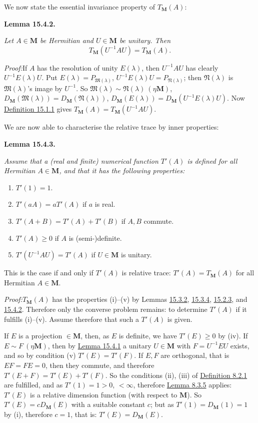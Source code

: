 \documentclass[12pt,b5paper,twoside]{article}
\newcommand{\M}{\mathbf M}
\newcommand{\Lemma}[1]{%
  \par\smallskip\noindent\phantomsection\label{lem:#1}\textbf{Lemma #1.}\enspace
}
\newcommand{\Proof}{\par\noindent\textit{Proof:}\enspace}
\newcommand{\defref}[1]{\hyperref[def:#1]{Definition #1}}
\newcommand{\lemref}[1]{\hyperref[lem:#1]{Lemma #1}}
\begin{document}
We now state the essential invariance property of \(T_{\M}(A)\):

\Lemma{15.4.2}
{\itshape Let \(A\in\M\) be Hermitian and \(U\in\M\) be unitary. Then
\[
T_{\M}(U^{-1}AU)=T_{\M}(A).
\]}

\Proof If \(A\) has the resolution of unity \(E(\lambda)\), then
\(U^{-1}AU\) has clearly \(U^{-1}E(\lambda)U\). Put
\(E(\lambda)=P_{\mathfrak M(\lambda)}\),
\(U^{-1}E(\lambda)U=P_{\mathfrak N(\lambda)}\); then
\(\mathfrak N(\lambda)\) is \(\mathfrak M(\lambda)\)'s image by
\(U^{-1}\). So
\(\mathfrak M(\lambda)\sim\mathfrak N(\lambda)\ (\mathbin\eta\M)\),
\(D_{\M}(\mathfrak M(\lambda))=D_{\M}(\mathfrak N(\lambda))\),
\(D_{\M}(E(\lambda))=D_{\M}(U^{-1}E(\lambda)U)\). Now
\defref{15.1.1} gives \(T_{\M}(A)=T_{\M}(U^{-1}AU)\).

We are now able to characterise the relative trace by inner properties:

\Lemma{15.4.3}
{\itshape Assume that a (real and finite) numerical function \(T'(A)\) is
defined for all Hermitian \(A\in\M\), and that it has the following properties:
\begin{enumerate}[label=(\roman*)]
\item \(T'(1)=1\).
\item \(T'(aA)=aT'(A)\) if \(a\) is real.
\item \(T'(A+B)=T'(A)+T'(B)\) if \(A,B\) commute.
\item \(T'(A)\geq0\) if \(A\) is (semi-)definite.
\item \(T'(U^{-1}AU)=T'(A)\) if \(U\in\M\) is unitary.
\end{enumerate}
This is the case if and only if \(T'(A)\) is relative trace:
\(T'(A)=T_{\M}(A)\) for all Hermitian \(A\in\M\).}

\Proof \(T_{\M}(A)\) has the properties (i)--(v) by Lemmas
\hyperref[lem:15.3.2]{15.3.2}, \hyperref[lem:15.3.4]{15.3.4},
\hyperref[lem:15.2.3]{15.2.3}, and \hyperref[lem:15.4.2]{15.4.2}.
Therefore only the
converse problem remains: to determine \(T'(A)\) if it fulfills (i)--(v).
Assume therefore that such a \(T'(A)\) is given.

If \(E\) is a projection \(\in\M\), then, as \(E\) is definite, we have
\(T'(E)\geq0\) by (iv). If \(E\sim F\ (\mathbin\eta\M)\), then by
\lemref{15.4.1} a unitary \(U\in\M\) with \(F=U^{-1}EU\) exists, and so
by condition (v) \(T'(E)=T'(F)\). If \(E,F\) are orthogonal, that is
\(EF=FE=0\), then they commute, and therefore
\(T'(E+F)=T'(E)+T'(F)\). So the conditions (ii), (iii) of
\defref{8.2.1} are fulfilled, and as \(T'(1)=1>0\), \(<\infty\), therefore
\lemref{8.3.5} applies: \(T'(E)\) is a relative dimension function (with
respect to \(\M\)). So \(T'(E)=cD_{\M}(E)\) with a suitable constant \(c\);
but as \(T'(1)=D_{\M}(1)=1\) by (i), therefore \(c=1\), that is:
\(T'(E)=D_{\M}(E)\).
\end{document}
